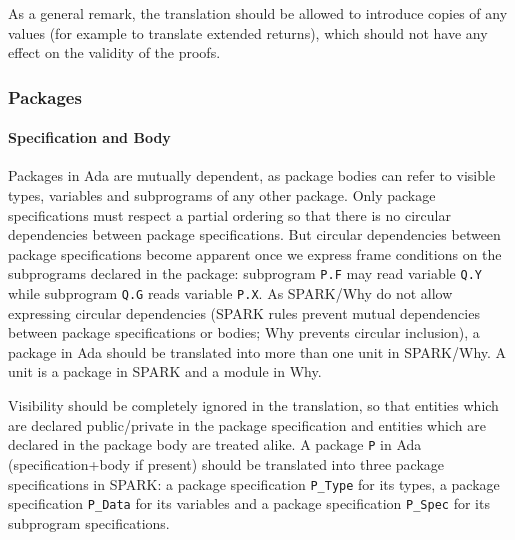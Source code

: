 \documentclass{article}
\newcounter{example}
\begin{document}
As a general remark, the translation should be allowed to introduce copies of
any values (for example to translate extended returns), which should not have
any effect on the validity of the proofs.

\subsubsection{Packages}
\label{Ada2SPARK:packages}

\paragraph{Specification and Body}

Packages in Ada are mutually dependent, as package bodies can refer to visible
types, variables and subprograms of any other package. Only package
specifications must respect a partial ordering so that there is no circular
dependencies between package specifications. But circular dependencies between
package specifications become apparent once we express frame conditions on the
subprograms declared in the package: subprogram \verb|P.F| may read variable
\verb|Q.Y| while subprogram \verb|Q.G| reads variable \verb|P.X|.  As SPARK/Why
do not allow expressing circular dependencies (SPARK rules prevent mutual
dependencies between package specifications or bodies; Why prevents circular
inclusion), a package in Ada should be translated into more than one unit in
SPARK/Why. A unit is a package in SPARK and a module in Why.

Visibility should be completely ignored in the translation, so that entities
which are declared public/private in the package specification and entities
which are declared in the package body are treated alike. A package \verb|P| in
Ada (specification+body if present) should be translated into three package
specifications in SPARK: a package specification \verb|P_Type| for its types, a
package specification \verb|P_Data| for its variables and a package
specification \verb|P_Spec| for its subprogram specifications.
\end{document}
